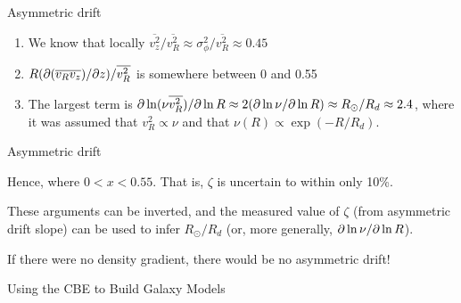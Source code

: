 \documentclass[letterpaper,landscape]{slides}
\begin{document}
\begin{slide}
\begin{center}
{\large \color{red} 
                  Asymmetric drift   }
\end{center}

\begin{enumerate}
\item We know that locally $\overline{v_z^2}/\overline{v_R^2} \approx \sigma_\phi^2/\overline{v_R^2} \approx 0.45$
\item $R(\partial (\overline{v_R v_z}) / \partial z)/\overline{v_R^2}$ is somewhere between 0 and 0.55
\item The largest term is ${\partial \ln(\nu \overline{v_R^2}) / \partial \ln{R}} \approx 
2 ({\partial \ln{\nu} / \partial \ln{R}}) \approx R_\odot /R_d \approx 2.4$, where it was assumed
that $v_R^2 \propto \nu$ and that $\nu(R) \propto \exp(-R/R_d)$.

\end{enumerate}

\vfill
\end{slide}


\begin{slide}
\begin{center}
{\large \color{red} 
                  Asymmetric drift   }
\end{center}

Hence, 
where $0 < x < 0.55$. That is, $\zeta$ is uncertain to within only 10\%. 

These arguments can be inverted, and the measured value of $\zeta$ (from asymmetric drift slope)
can be used to infer $R_\odot/R_d$ (or, more generally, $\partial \ln{\nu} / \partial \ln{R}$).

{\color{red} If there were no density gradient, there would be no asymmetric 
drift!}

\vfill
\end{slide}


\begin{slide}
\vskip 4.5in
\begin{center}
{\large \color{red} 
                  Using the CBE to Build Galaxy Models   }
\end{center}

\vskip 3.8in


\end{slide}
\end{document}
